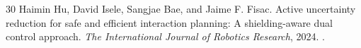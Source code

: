 \documentclass[11pt,a4paper]{article}
\numberwithin{equation}{section}
\theoremstyle{definition}
\begin{document}
\begin{thebibliography}{30}
Haimin Hu, David Isele, Sangjae Bae, and Jaime F. Fisac.
\newblock Active uncertainty reduction for safe and efficient interaction planning: A shielding-aware dual control approach.
\newblock \emph{The International Journal of Robotics Research}, 2024.
\newblock {}.

\end{thebibliography}
\end{document}
